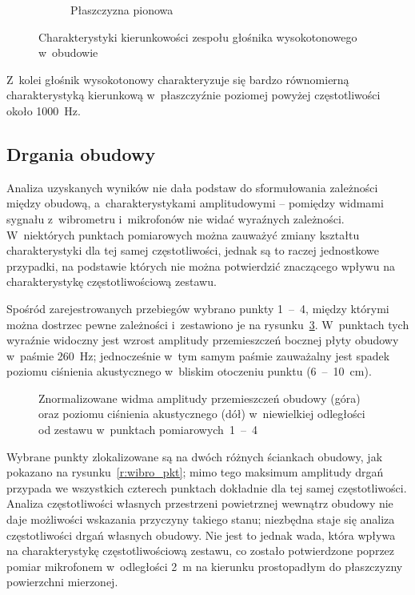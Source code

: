 \documentclass[12pt]{oska}
\newcommand{\range}[2]{\num{#1}~--~\num{#2}}
\begin{document}
\begin{figure}[!ht]
\begin{subfigure}[b]{.46\textwidth}
			\caption{Płaszczyzna pionowa}
			\label{r:H_pion}
		\end{subfigure}
		\caption{Charakterystyki kierunkowości zespołu głośnika wysokotonowego w~obudowie}
		\label{r:kierunkowosc_H}
	\end{figure}
	
	Z~kolei głośnik wysokotonowy charakteryzuje się bardzo równomierną charakterystyką kierunkową w~płaszczyźnie poziomej powyżej częstotliwości około \SI{1000}{Hz}.
	
	
	
	\subsection{Drgania obudowy}
	
	Analiza uzyskanych wyników nie dała podstaw do sformułowania zależności między obudową, a~charakterystykami amplitudowymi -- pomiędzy widmami sygnału z~wibrometru i~mikrofonów nie widać wyraźnych zależności. W~niektórych punktach pomiarowych można zauważyć zmiany kształtu charakterystyki dla tej samej częstotliwości, jednak są to raczej jednostkowe przypadki, na podstawie których nie można potwierdzić znaczącego wpływu na charakterystykę częstotliwościową zestawu.
	
	Spośród zarejestrowanych przebiegów wybrano punkty \range{1}{4}, między którymi można dostrzec pewne zależności i~zestawiono je na rysunku~\ref{r:wibrometr_1-4}. W~punktach tych wyraźnie widoczny jest wzrost amplitudy przemieszczeń bocznej płyty obudowy w~paśmie \SI{260}{\hertz}; jednocześnie w~tym samym paśmie zauważalny jest spadek poziomu ciśnienia akustycznego w~bliskim otoczeniu punktu (\range{6}{10}~\si{\cm}).
	
	\begin{figure}[!ht]
		\centering
		\caption{Znormalizowane widma amplitudy przemieszczeń obudowy (góra) oraz poziomu ciśnienia akustycznego (dół) w~niewielkiej odległości od zestawu w~punktach pomiarowych~\range{1}{4}}
		\label{r:wibrometr_1-4}
	\end{figure}
	
	Wybrane punkty zlokalizowane są na dwóch różnych ściankach obudowy, jak pokazano na rysunku~\ref{r:wibro_pkt}; mimo tego maksimum amplitudy drgań przypada we wszystkich czterech punktach dokładnie dla tej samej częstotliwości. Analiza częstotliwości własnych przestrzeni powietrznej wewnątrz obudowy nie daje możliwości wskazania przyczyny takiego stanu; niezbędna staje się analiza częstotliwości drgań własnych obudowy. Nie jest to jednak wada, która wpływa na charakterystykę częstotliwościową zestawu, co zostało potwierdzone poprzez pomiar mikrofonem w~odległości \SI{2}{\metre} na kierunku prostopadłym do płaszczyzny powierzchni mierzonej.
	
\end{document}
